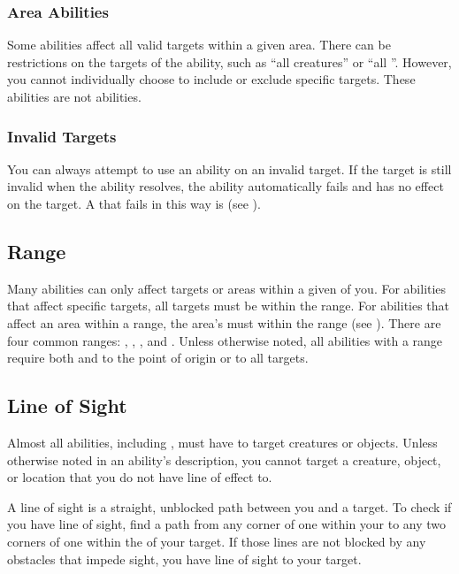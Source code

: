         \subsubsection{Area Abilities}
            Some abilities affect all valid targets within a given area.
            There can be restrictions on the targets of the ability, such as ``all creatures'' or ``all ''.
            However, you cannot individually choose to include or exclude specific targets.
            These abilities are not  abilities.

        \subsubsection{Invalid Targets}
            You can always attempt to use an ability on an invalid target.
            If the target is still invalid when the ability resolves, the ability automatically fails and has no effect on the target.
            A  that fails in this way is  (see ).

    \subsection{Range}\label{Range}
        Many abilities can only affect targets or areas within a given  of you.
        For abilities that affect specific targets, all targets must be within the range.
        For abilities that affect an area within a range, the area's  must within the range (see ).
        There are four common ranges: \rngclose, \rngmed, \rnglong, and \rngext.
        Unless otherwise noted, all abilities with a range require both  and  to the point of origin or to all targets.

    \subsection{Line of Sight}\label{Line of Sight}
        Almost all abilities, including , must have  to target creatures or objects.
        Unless otherwise noted in an ability's description, you cannot target a creature, object, or location that you do not have line of effect to.

        A line of sight is a straight, unblocked path between you and a target.
        To check if you have line of sight, find a path from any corner of one  within your  to any two corners of one  within the  of your target.
        If those lines are not blocked by any obstacles that impede sight, you have line of sight to your target.

